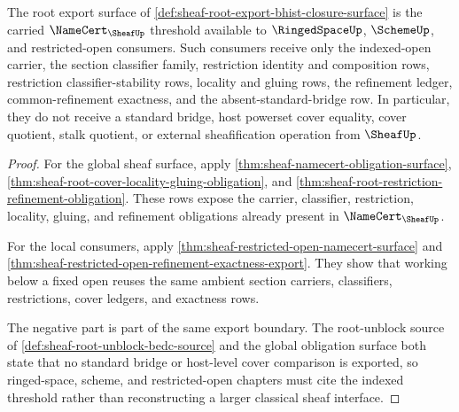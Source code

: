 \begin{theorem}
\label{thm:sheaf-root-export-downstream-threshold}
The root export surface of \autoref{def:sheaf-root-export-bhist-closure-surface} is the carried $\NameCert_{\SheafUp}$ threshold available to $\RingedSpaceUp$, $\SchemeUp$, and restricted-open consumers. Such consumers receive only the indexed-open carrier, the section classifier family, restriction identity and composition rows, restriction classifier-stability rows, locality and gluing rows, the refinement ledger, common-refinement exactness, and the absent-standard-bridge row. In particular, they do not receive a standard bridge, host powerset cover equality, cover quotient, stalk quotient, or external sheafification operation from $\SheafUp$.
\end{theorem}
\begin{proof}
For the global sheaf surface, apply \autoref{thm:sheaf-namecert-obligation-surface}, \autoref{thm:sheaf-root-cover-locality-gluing-obligation}, and \autoref{thm:sheaf-root-restriction-refinement-obligation}. These rows expose the carrier, classifier, restriction, locality, gluing, and refinement obligations already present in $\NameCert_{\SheafUp}$.

For the local consumers, apply \autoref{thm:sheaf-restricted-open-namecert-surface} and \autoref{thm:sheaf-restricted-open-refinement-exactness-export}. They show that working below a fixed open reuses the same ambient section carriers, classifiers, restrictions, cover ledgers, and exactness rows.

The negative part is part of the same export boundary. The root-unblock source of \autoref{def:sheaf-root-unblock-bedc-source} and the global obligation surface both state that no standard bridge or host-level cover comparison is exported, so ringed-space, scheme, and restricted-open chapters must cite the indexed threshold rather than reconstructing a larger classical sheaf interface.
\end{proof}
